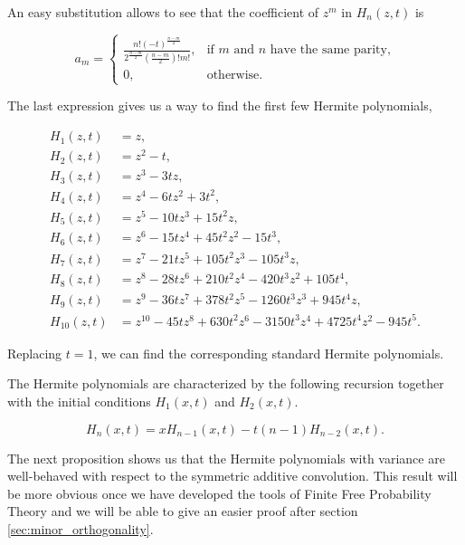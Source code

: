 An easy substitution allows to see that the coefficient of $z^m$ in $H_n(z,t)$ is 

\begin{equation}
    a_m = \left\{ \begin{array}{cc}
        \frac{n!(-t)^{\frac{n-m}2}}{2^{\frac{n-m}{2}}\left( \frac{n-m}{2}\right)!m!}, &  \text{if $m$ and $n$ have the same parity,} \\
        0, & \text{otherwise}.
    \end{array} \right.
\end{equation}


The last expression gives us a way to find the first few Hermite polynomials,

\begin{align*}
    H_1(z,t) &= z,\\
    H_2(z,t) &= z^2 - t, \\
    H_3(z,t) &= z^3 - 3tz,\\ 
    H_4(z,t) &= z^4 - 6tz^2 + 3t^2,\\ 
    H_5(z,t) &= z^5 - 10tz^3 + 15t^2z,\\ 
    H_6(z,t) &= z^6 - 15tz^4 + 45 t^2 z^2 - 15t^3,\\ 
    H_7(z,t) &= z^7 - 21tz^5 + 105t^2z^3 -105t^3z,\\ 
    H_8(z,t) &= z^8 - 28tz^6 + 210t^2z^4 - 420t^3z^2 + 105t^4,\\ 
    H_9(z,t) &= z^9 - 36tz^7 + 378t^2z^5 - 1260t^3z^3 + 945t^4z,\\ 
    H_{10}(z,t) &= z^{10} - 45tz^8 + 630t^2z^6 - 3150t^3z^4 + 4725t^4z^2 - 945t^5.
\end{align*}

Replacing $t=1$, we can find the corresponding standard Hermite polynomials.

The Hermite polynomials are characterized by the following recursion together with the initial conditions $H_1(x,t)$ and $H_2(x,t)$.

\begin{equation} \label{eq:recursion_hermite}
    H_n(x,t) = x H_{n-1}(x,t) - t(n-1)H_{n-2}(x,t).
\end{equation}


The next proposition shows us that the Hermite polynomials with variance are well-behaved with respect to the symmetric additive convolution. This result will be more obvious once we have developed the tools of Finite Free Probability Theory and we will be able to give an easier proof after section \ref{sec:minor_orthogonality}.

